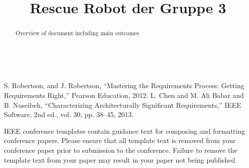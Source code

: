 \documentclass[conference]{IEEEtran}
\begin{document}
\title{Rescue Robot der Gruppe 3}\\

\author{
\and
{}
\and
{}
\and
{}
}

\maketitle

\begin{abstract}
Overview of document including main outcomes
\end{abstract}
















\begin{thebibliography}{00}
 S. Robertson, and J. Robertson, ``Mastering the Requirements Process: Getting Requirements Right,'' Pearson Education, 2012.
 L. Chen and M. Ali Babar and B. Nuseibeh, ``Characterizing Architecturally Significant Requirements,'' IEEE Software, 2nd ed., vol. 30, pp. 38--45, 2013.
\end{thebibliography}
\vspace{12pt}
\color{red}
IEEE conference templates contain guidance text for composing and formatting conference papers. Please ensure that all template text is removed from your conference paper prior to submission to the conference. Failure to remove the template text from your paper may result in your paper not being published.
\end{document}
